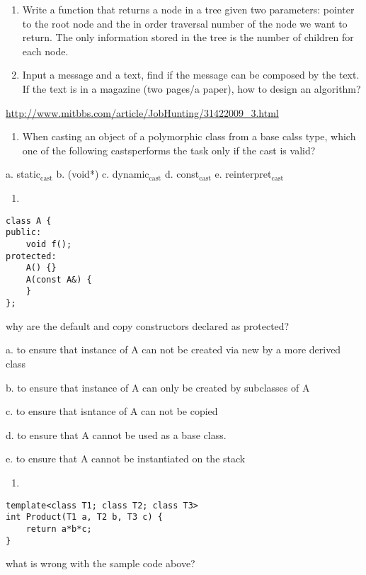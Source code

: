 \documentclass[12pt]{book}
\begin{document}
\begin{enumerate}
\item Write a function that returns a node in a tree given two parameters: pointer to the root node and the in order traversal number of the node we want to return. The only information stored in the tree is the number of children for each node.
\item Input a message and a text, find if the message can be composed by
the text. If the text is in a magazine (two pages/a paper), how to design an algorithm?
\end{enumerate}
\url{http://www.mitbbs.com/article/JobHunting/31422009_3.html}

\begin{enumerate}
\item When casting an object of a polymorphic class from a base calss type, which one of the following castsperforms the task only if the cast is valid?
\end{enumerate}
a. static$_{\text{cast}}$
b. (void*) 
c. dynamic$_{\text{cast}}$
d. const$_{\text{cast}}$
e. reinterpret$_{\text{cast}}$

\begin{enumerate}
\item 
\end{enumerate}
\lstset{language=java,label= ,caption= ,numbers=none}
\begin{lstlisting}
class A {
public:
    void f();
protected:
    A() {}
    A(const A&) {
    }
};
\end{lstlisting}
why are the default and copy constructors declared as protected?

a. to ensure that instance of A can not be created via new by a more derived class

b. to ensure that instance of A can only be created by subclasses of A

c. to ensure that isntance of A can not be copied

d. to ensure that A cannot be used as a base class.

e. to ensure that A cannot be instantiated on the stack

\begin{enumerate}
\item 
\end{enumerate}
\lstset{language=java,label= ,caption= ,numbers=none}
\begin{lstlisting}
template<class T1; class T2; class T3>
int Product(T1 a, T2 b, T3 c) {
    return a*b*c;
}
\end{lstlisting}
what is wrong with the sample code above?
\end{document}
